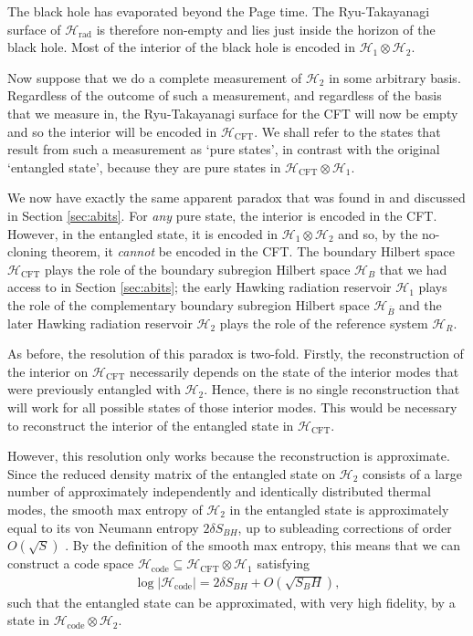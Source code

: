 \documentclass[12pt]{article}
\begin{document}
The black hole has evaporated beyond the Page time. The Ryu-Takayanagi surface of $\mathcal{H}_\text{rad}$ is therefore non-empty and lies just inside the horizon of the black hole. Most of the interior of the black hole is encoded in $\mathcal{H}_{1} \otimes \mathcal{H}_{2}$.

Now suppose that we do a complete measurement of $\mathcal{H}_{2}$ in some arbitrary basis. Regardless of the outcome of such a measurement, and regardless of the basis that we measure in, the Ryu-Takayanagi surface for the CFT will now be empty and so the interior will be encoded in $\mathcal{H}_\text{CFT}$. We shall refer to the states that result from such a measurement as `pure states', in contrast with the original `entangled state', because they are pure states in $\mathcal{H}_\text{CFT} \otimes \mathcal{H}_{1}$.

We now have exactly the same apparent paradox that was found in \cite{hayden2018learning} and discussed in Section \ref{sec:abits}. For \emph{any} pure state, the interior is encoded in the CFT. However, in the entangled state, it is encoded in $\mathcal{H}_{1} \otimes \mathcal{H}_{2}$ and so, by the no-cloning theorem, it \emph{cannot} be encoded in the CFT. The boundary Hilbert space $\mathcal{H}_\text{CFT}$ plays the role of the boundary subregion Hilbert space $\mathcal{H}_B$ that we had access to in Section \ref{sec:abits}; the early Hawking radiation reservoir $\mathcal{H}_{1}$ plays the role of the complementary boundary subregion Hilbert space $\mathcal{H}_{\bar B}$ and the later Hawking radiation reservoir $\mathcal{H}_{2}$ plays the role of the reference system $\mathcal{H}_R$.

As before, the resolution of this paradox is two-fold. Firstly, the reconstruction of the interior on $\mathcal{H}_\text{CFT}$ necessarily depends on the state of the interior modes that were previously entangled with $\mathcal{H}_{2}$.  Hence, there is no single reconstruction that will work for all possible states of those interior modes. This would be necessary to reconstruct the interior of the entangled state in $\mathcal{H}_\text{CFT}$. 

However, this resolution only works because the reconstruction is approximate. Since the reduced density matrix of the entangled state on $\mathcal{H}_2$ consists of a large number of approximately independently and identically distributed thermal modes, the smooth max entropy of $\mathcal{H}_{2}$ in the entangled state is approximately equal to its von Neumann entropy $2\delta S_{BH}$, up to subleading corrections of order $O(\sqrt{S})$ \cite{tomamichel2009fully}. By the definition of the smooth max entropy, this means that we can construct a code space $\mathcal{H}_\text{code} \subseteq \mathcal{H}_\text{CFT} \otimes \mathcal{H}_{1}$ satisfying
\begin{align}
\log |\mathcal{H}_\text{code}| = 2 \delta S_{BH} + O(\sqrt{S_BH}),
\end{align}
such that the entangled state can be approximated, with very high fidelity, by a state in $\mathcal{H}_\text{code} \otimes \mathcal{H}_{2}$.
\end{document}
